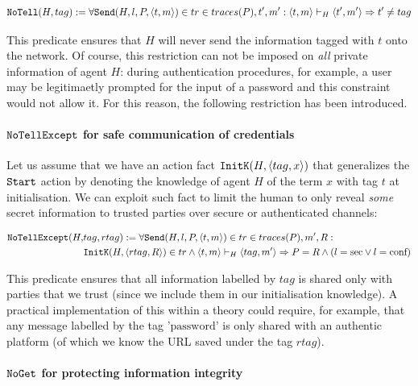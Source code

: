 \documentclass{article}
\newcommand{\mono}[1]{\textrm{\tt #1}}
\begin{document}
\begin{equation*}
    \mono{NoTell}(H, tag) := \forall \mono{Send}(H, l, P, \langle t,m \rangle) \in tr \in traces(P), t', m' : \langle t, m \rangle \vdash_H \langle t', m' \rangle \Rightarrow t' \not = tag
\end{equation*}

This predicate ensures that $H$ will never send the information tagged with $t$ onto the network. Of course, this restriction can not be imposed on \textit{all} private information of agent $H$: during authentication procedures, for example, a user may be legitimaetly prompted for the input of a password and this constraint would not allow it. For this reason, the following restriction has been introduced.

\paragraph{$\mono{NoTellExcept}$ for safe communication of credentials}

Let us assume that we have an action fact $\mono{InitK}(H, \langle tag, x \rangle)$ that generalizes the $\mono{Start}$ action by denoting the knowledge of agent $H$ of the term $x$ with tag $t$ at initialisation. We can exploit such fact to limit the human to only reveal \textit{some} secret information to trusted parties over secure or authenticated channels:

\begin{align*}
    \mono{NoTellExcept}(H,&tag,rtag) := \forall \mono{Send}(H,l,P,\langle t,m \rangle) \in tr \in traces(P), m', R : \\
    &\mono{InitK}(H, \langle rtag, R \rangle) \in tr \land \langle t,m \rangle \vdash_H \langle tag, m' \rangle \Rightarrow P = R \land (l=\textrm{sec} \lor l = \textrm{conf})
\end{align*}

This predicate ensures that all information labelled by $tag$ is shared only with parties that we trust (since we include them in our initialisation knowledge). A practical implementation of this within a theory could require, for example, that any message labelled by the tag $\textrm{'password'}$ is only shared with an authentic platform (of which we know the URL saved under the tag $rtag$).

\paragraph{$\mono{NoGet}$ for protecting information integrity}
\end{document}

